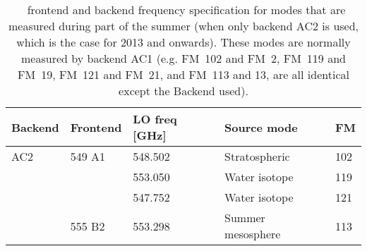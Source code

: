 \begin{table}
\centering
\caption{\smr\ frontend and backend frequency specification for modes that are
    measured during part of the summer (when only backend AC2 is used, which is
    the case for 2013 and onwards).
    These modes are normally measured by backend AC1 (e.g. FM~102 and FM~2,
    FM~119 and FM~19, FM~121 and FM~21, and FM~113 and 13, are all identical
    except the Backend used).
}
\label{table:config3}
\begin{tabular}{lllll}
  \toprule
  \textbf{Backend} & \textbf{Frontend} & \textbf{LO freq [GHz]} & \textbf{Source mode} & \textbf{FM} \\
  \midrule
  AC2              & 549 A1            & 548.502                & Stratospheric        & 102 \\
  \cline{3-3}
  \cline{4-4}
  \cline{5-5}
                   &                   & 553.050                & Water isotope        & 119 \\
  \cline{3-3}
  \cline{4-4}
  \cline{5-5}
                   &                   & 547.752                & Water isotope        & 121 \\
  \cline{2-2}
  \cline{3-3}
  \cline{4-4}
  \cline{5-5}
                   & 555 B2            & 553.298                & Summer mesosphere    & 113 \\
  \bottomrule
\end{tabular}
\end{table}


